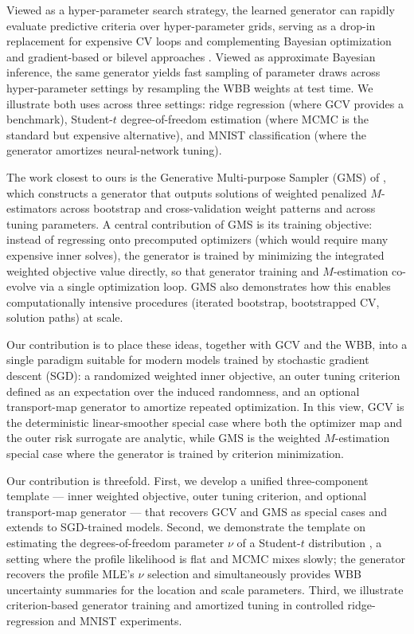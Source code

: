 \documentclass[12pt]{article}
\begin{document}
Viewed as a hyper-parameter search strategy, the learned generator can rapidly evaluate predictive criteria over hyper-parameter grids, serving as a drop-in replacement for expensive CV loops and complementing Bayesian optimization \citep{snoek2012practical,bergstra2012random,baker2022analyzing} and gradient-based or bilevel approaches \citep{maclaurin2015gradient,franceschi2018bilevel}. Viewed as approximate Bayesian inference, the same generator yields fast sampling of parameter draws across hyper-parameter settings by resampling the WBB weights at test time. We illustrate both uses across three settings: ridge regression (where GCV provides a benchmark), Student-$t$ degree-of-freedom estimation (where MCMC is the standard but expensive alternative), and MNIST classification (where the generator amortizes neural-network tuning).

The work closest to ours is the Generative Multi-purpose Sampler (GMS) of \citet{shin2023generative,shin2024generative}, which constructs a generator that outputs solutions of weighted penalized $M$-estimators across bootstrap and cross-validation weight patterns and across tuning parameters. A central contribution of GMS is its training objective: instead of regressing onto precomputed optimizers (which would require many expensive inner solves), the generator is trained by minimizing the integrated weighted objective value directly, so that generator training and $M$-estimation co-evolve via a single optimization loop. GMS also demonstrates how this enables computationally intensive procedures (iterated bootstrap, bootstrapped CV, solution paths) at scale.

Our contribution is to place these ideas, together with GCV and the WBB, into a single paradigm suitable for modern models trained by stochastic gradient descent (SGD): a randomized weighted inner objective, an outer tuning criterion defined as an expectation over the induced randomness, and an optional transport-map generator to amortize repeated optimization. In this view, GCV is the deterministic linear-smoother special case where both the optimizer map and the outer risk surrogate are analytic, while GMS is the weighted $M$-estimation special case where the generator is trained by criterion minimization.

Our contribution is threefold. First, we develop a unified three-component template --- inner weighted objective, outer tuning criterion, and optional transport-map generator --- that recovers GCV and GMS as special cases and extends to SGD-trained models. Second, we demonstrate the template on estimating the degrees-of-freedom parameter $\nu$ of a Student-$t$ distribution \citep{fonseca2008objective}, a setting where the profile likelihood is flat and MCMC mixes slowly; the generator recovers the profile MLE's $\nu$ selection and simultaneously provides WBB uncertainty summaries for the location and scale parameters. Third, we illustrate criterion-based generator training and amortized tuning in controlled ridge-regression and MNIST experiments.
\end{document}
